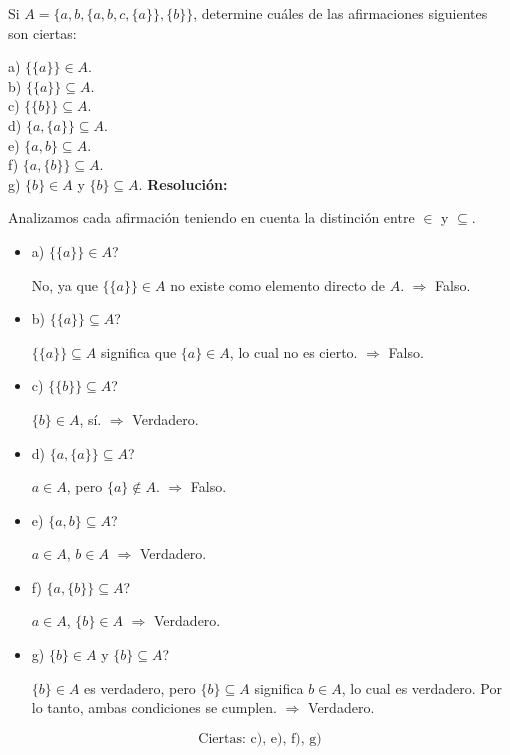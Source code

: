 \documentclass[a4paper,12pt]{article}
\begin{document}
\begin{ejercicio}[title=Ejercicio 8]
Si $A = \{a,b,\{a,b,c,\{a\}\},\{b\}\}$, determine cuáles de las afirmaciones siguientes son ciertas:

a) $\{\{a\}\}\in A$.\\
b) $\{\{a\}\}\subseteq A$.\\
c) $\{\{b\}\}\subseteq A$.\\
d) $\{a,\{a\}\}\subseteq A$.\\
e) $\{a,b\}\subseteq A$.\\
f) $\{a,\{b\}\}\subseteq A$.\\
g) $\{b\}\in A$ y $\{b\}\subseteq A$.
\tcblower
\textbf{Resolución:}

Analizamos cada afirmación teniendo en cuenta la distinción entre \(\in\) y \(\subseteq\).

\begin{itemize}
\item a) $\{\{a\}\} \in A$?  

No, ya que $\{\{a\}\} \in A$ no existe como elemento directo de $A$.
\(\Rightarrow\) Falso.

\item b) $\{\{a\}\} \subseteq A$?  

$\{\{a\}\} \subseteq A$ significa que $\{a\} \in A$, lo cual no es cierto.  
\(\Rightarrow\) Falso.

\item c) $\{\{b\}\} \subseteq A$?  

$\{b\} \in A$, sí.  
\(\Rightarrow\) Verdadero.

\item d) $\{a,\{a\}\} \subseteq A$?  

$a \in A$, pero $\{a\} \notin A$.  
\(\Rightarrow\) Falso.

\item e) $\{a,b\} \subseteq A$?  

$a \in A$, $b \in A$ \(\Rightarrow\) Verdadero.

\item f) $\{a,\{b\}\} \subseteq A$?  

$a \in A$, $\{b\} \in A$ \(\Rightarrow\) Verdadero.

\item g) $\{b\} \in A$ y $\{b\} \subseteq A$?  

$\{b\} \in A$ es verdadero, pero $\{b\} \subseteq A$ significa $b \in A$, lo cual es verdadero. Por lo tanto, ambas condiciones se cumplen.  
\(\Rightarrow\) Verdadero.
\end{itemize}

\[
\boxed{\text{Ciertas: c), e), f), g)}}
\]

\end{ejercicio}
\end{document}
